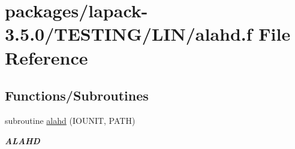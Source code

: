 \hypertarget{alahd_8f}{}\section{packages/lapack-\/3.5.0/\+T\+E\+S\+T\+I\+N\+G/\+L\+I\+N/alahd.f File Reference}
\label{alahd_8f}
\subsection*{Functions/\+Subroutines}
\begin{DoxyCompactItemize}
\item 
subroutine \hyperlink{group__aux__lin_ga20b03b7c76718fe782fcd11607de99ef}{alahd} (I\+O\+U\+N\+I\+T, P\+A\+T\+H)
\begin{DoxyCompactList}\small\item\em {\bfseries A\+L\+A\+H\+D} \end{DoxyCompactList}\end{DoxyCompactItemize}
